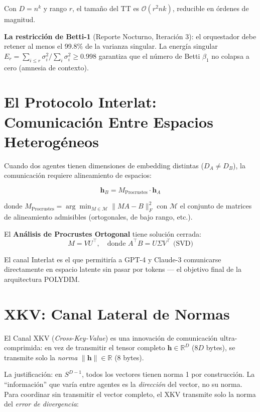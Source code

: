 Con $D = n^k$ y rango $r$, el tamaño del TT es $\mathcal{O}(r^2 n k)$, reducible en órdenes de magnitud.

\textbf{La restricción de Betti-1} (Reporte Nocturno, Iteración 3): el orquestador
debe retener al menos el 99.8\% de la varianza singular. La energía singular
$E_r = \sum_{i \le r} \sigma_i^2 / \sum_{i} \sigma_i^2 \ge 0.998$ garantiza que
el número de Betti $\beta_1$ no colapsa a cero (amnesia de contexto).

\section{El Protocolo Interlat: Comunicación Entre Espacios Heterogéneos}

Cuando dos agentes tienen dimensiones de embedding distintas ($D_A \ne D_B$), la
comunicación requiere alineamiento de espacios:

\begin{equation}
\mathbf{h}_B = M_{\text{Procrustes}} \cdot \mathbf{h}_A
\end{equation}

donde $M_{\text{Procrustes}} = \arg\min_{M \in \mathcal{M}} \|{M A - B}\|_F^2$
con $\mathcal{M}$ el conjunto de matrices de alineamiento admisibles (ortogonales,
de bajo rango, etc.).

El \textbf{Análisis de Procrustes Ortogonal} tiene solución cerrada:
\begin{equation}
M = V U^\top, \quad \text{donde } A^\top B = U \Sigma V^\top \text{ (SVD)}
\end{equation}

El canal Interlat es el que permitiría a GPT-4 y Claude-3 comunicarse directamente
en espacio latente sin pasar por tokens --- el objetivo final de la arquitectura POLYDIM.

\section{XKV: Canal Lateral de Normas}

El Canal XKV (\textit{Cross-Key-Value}) es una innovación de comunicación ultra-comprimida:
en vez de transmitir el tensor completo $\mathbf{h} \in \mathbb{R}^D$ ($8D$ bytes), se transmite
solo la \textit{norma} $\|{\mathbf{h}\|} \in \mathbb{R}$ (8 bytes).

La justificación: en $S^{D-1}$, todos los vectores tienen norma 1 por construcción.
La ``información'' que varía entre agentes es la \textit{dirección} del vector, no su norma.
Para coordinar sin transmitir el vector completo, el XKV transmite solo la norma del
\textit{error de divergencia}:

